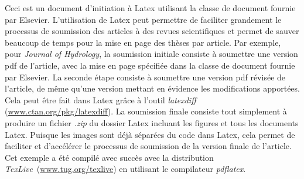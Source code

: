 \documentclass[../exemple_master.tex]{subfiles}
\begin{document}
Ceci est un document d'initiation à Latex utilisant la classe de document fournie par Elsevier. L'utilisation de Latex peut permettre de faciliter grandement le processus de soumission des articles à des revues scientifiques et permet de sauver beaucoup de temps pour la mise en page des thèses par article. Par exemple, pour \emph{Journal of Hydrology}, la soumission initiale consiste à soumettre une version pdf de l'article, avec la mise en page spécifiée dans la classe de document fournie par Elsevier. La seconde étape consiste à soumettre une version pdf révisée de l'article, de même qu'une version mettant en évidence les modifications apportées. Cela peut être fait dans Latex grâce à l'outil \emph{latexdiff} (\url{www.ctan.org/pkg/latexdiff}). La soumission finale consiste tout simplement à produire un fichier \emph{.zip} du dossier Latex incluant les figures et tous les documents Latex. Puisque les images sont déjà séparées du code dans Latex, cela permet de faciliter et d'accélérer le processus de soumission de la version finale de l'article. Cet exemple a été compilé avec succès avec la distribution \emph{TexLive}~(\url{www.tug.org/texlive}) en utilisant le compilateur \emph{pdflatex}.
\end{document}
